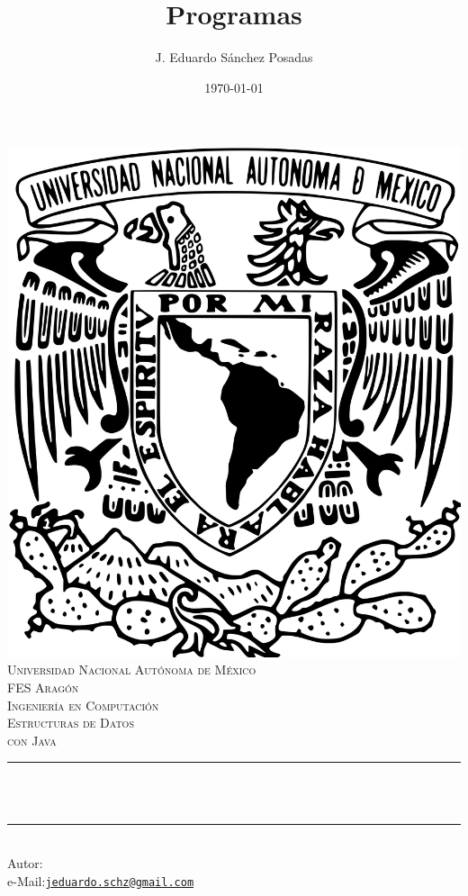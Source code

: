 \documentclass[11pt]{article}
\title{Programas}						%
\author{J. Eduardo Sánchez Posadas}					%
\date{\today}											%
\makeatletter
\let\thetitle\@title
\let\theauthor\@author
\let\thedate\@date
\makeatother
\begin{document}

\begin{titlepage}
	\centering
    \vspace*{0.5 cm}
    \includegraphics[scale=0.05]{pics/escudo.png} \\[1.0 cm]	%
    \textsc{\Large Universidad Nacional Autónoma de México}\\[2.0 cm]	%
	\textsc{\Large FES Aragón\\ Ingeniería en Computación}\\[0.5 cm]								%
	\textsc{\Large Estructuras de Datos \\ con Java}\\[0.5 cm]	%
	\rule{\linewidth}{0.2 mm} \\[0.4 cm]
	{ \huge \bfseries \thetitle}\\
	\rule{\linewidth}{0.2 mm} \\[1.5 cm]
	 			{Autor: \large \theauthor} \\
	 			{e-Mail:\href{mailto:jeduardo.schz@gmail.com}{\texttt{jeduardo.schz@gmail.com}}}\\[0.5cm]

	{\large \thedate}\\[2 cm]
 
	\vfill
	
\end{titlepage}
\end{document}

